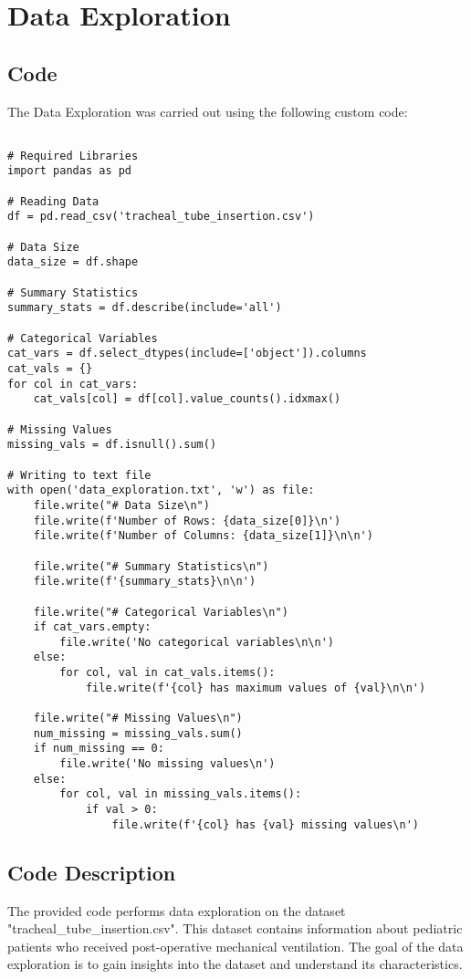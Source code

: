 \documentclass[11pt]{article}
\begin{document}
\section{Data Exploration}
\subsection{{Code}}
The Data Exploration was carried out using the following custom code:

\begin{verbatim}

# Required Libraries
import pandas as pd

# Reading Data
df = pd.read_csv('tracheal_tube_insertion.csv')

# Data Size
data_size = df.shape

# Summary Statistics
summary_stats = df.describe(include='all')

# Categorical Variables
cat_vars = df.select_dtypes(include=['object']).columns
cat_vals = {}
for col in cat_vars:
    cat_vals[col] = df[col].value_counts().idxmax()

# Missing Values
missing_vals = df.isnull().sum()

# Writing to text file
with open('data_exploration.txt', 'w') as file:
    file.write("# Data Size\n")
    file.write(f'Number of Rows: {data_size[0]}\n')
    file.write(f'Number of Columns: {data_size[1]}\n\n')

    file.write("# Summary Statistics\n")
    file.write(f'{summary_stats}\n\n')

    file.write("# Categorical Variables\n")
    if cat_vars.empty:
        file.write('No categorical variables\n\n')
    else:
        for col, val in cat_vals.items():
            file.write(f'{col} has maximum values of {val}\n\n')

    file.write("# Missing Values\n")
    num_missing = missing_vals.sum()
    if num_missing == 0:
        file.write('No missing values\n')
    else:
        for col, val in missing_vals.items():
            if val > 0:
                file.write(f'{col} has {val} missing values\n')

\end{verbatim}

\subsection{Code Description}

The provided code performs data exploration on the dataset "tracheal\_tube\_insertion.csv". This dataset contains information about pediatric patients who received post-operative mechanical ventilation. The goal of the data exploration is to gain insights into the dataset and understand its characteristics.
\end{document}
